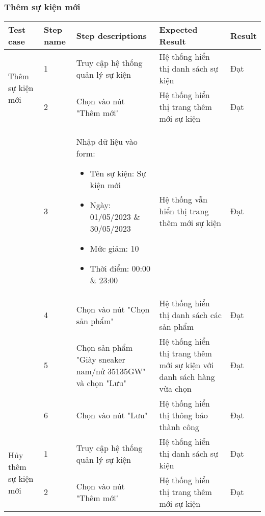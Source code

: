 \newpage
\subsubsection{Thêm sự kiện mới}
{
    \setlength\extrarowheight{6pt}
    \begin{longtable}{| p{2.5cm}| p{1cm}| p{5.5cm}| p{4.5cm} | p{1.5cm} |}
        \hline
        \textbf{Test case} & \textbf{Step name} & \textbf{Step descriptions} & \textbf{Expected Result} & \textbf{Result} \\
        \hline
        \multirow[t]{2}{2.5cm}{Thêm sự kiện mới} & 1 & Truy cập hệ thống quản lý sự kiện & Hệ thống hiển thị danh sách sự kiện & Đạt \\
        \cline{2-5}
         & 2 & Chọn vào nút "Thêm mới" & Hệ thống hiển thị trang thêm mới sự kiện & Đạt \\
        \cline{2-5}
        & 3 & Nhập dữ liệu vào form:
        \begin{itemize}
            \item Tên sự kiện: Sự kiện mới
            \item Ngày: 01/05/2023 \& 30/05/2023
            \item Mức giảm: 10
            \item Thời điểm: 00:00 \& 23:00 
        \end{itemize} & Hệ thống vẫn hiển thị trang thêm mới sự kiện & Đạt \\
        \cline{2-5}
         & 4 & Chọn vào nút "Chọn sản phẩm" & Hệ thống hiển thị danh sách các sản phẩm & Đạt \\
         \cline{2-5}
         & 5 & Chọn sản phẩm "Giày sneaker nam/nử 35135GW" và chọn "Lưu" & Hệ thống hiển thị trang thêm mới sự kiện với danh sách hàng vừa chọn & Đạt \\
         \cline{2-5}
         & 6 & Chọn vào nút "Lưu" & Hệ thống hiển thị thông báo thành công & Đạt \\
        \hline
        \multirow[t]{2}{2.5cm}{Hủy thêm sự kiện mới} & 1 & Truy cập hệ thống quản lý sự kiện & Hệ thống hiển thị danh sách sự kiện & Đạt \\
        \cline{2-5}
         & 2 & Chọn vào nút "Thêm mới" & Hệ thống hiển thị trang thêm mới sự kiện & Đạt \\

\end{longtable}}
